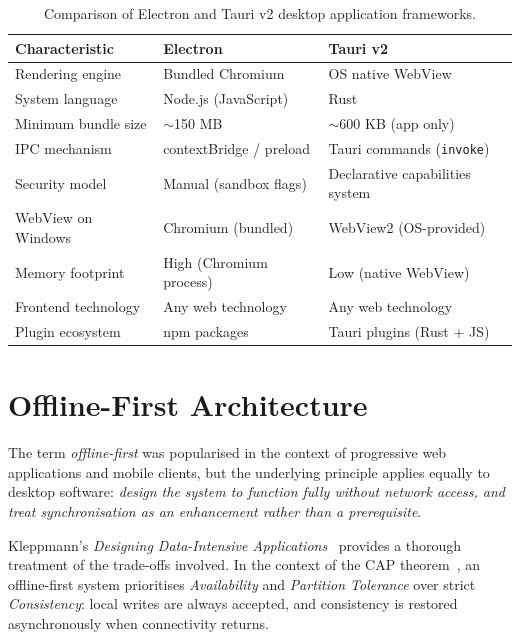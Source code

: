 \begin{table}[H]
\centering
\caption{Comparison of Electron and Tauri v2 desktop application frameworks.}
\label{tab:electron_tauri_comparison}
\begin{tabular}{lll}
\toprule
\textbf{Characteristic} &
\textbf{Electron} &
\textbf{Tauri v2} \\
\midrule
Rendering engine &
Bundled Chromium &
OS native WebView \\
System language &
Node.js (JavaScript) &
Rust \\
Minimum bundle size &
$\sim$150 MB &
$\sim$600 KB (app only) \\
IPC mechanism &
contextBridge / preload &
Tauri commands (\texttt{invoke}) \\
Security model &
Manual (sandbox flags) &
Declarative capabilities system \\
WebView on Windows &
Chromium (bundled) &
WebView2 (OS-provided) \\
Memory footprint &
High (Chromium process) &
Low (native WebView) \\
Frontend technology &
Any web technology &
Any web technology \\
Plugin ecosystem &
npm packages &
Tauri plugins (Rust + JS) \\
\bottomrule
\end{tabular}
\end{table}

\section{Offline-First Architecture}\label{sec:bg_offline}

The term \emph{offline-first} was popularised in the context of progressive web
applications and mobile clients, but the underlying principle applies equally to
desktop software: \emph{design the system to function fully without network access,
and treat synchronisation as an enhancement rather than a prerequisite}.

Kleppmann's \emph{Designing Data-Intensive Applications}~\cite{kleppmann2017designing}
provides a thorough treatment of the trade-offs involved.
In the context of the CAP theorem~\cite{brewer2012cap}, an offline-first system
prioritises \emph{Availability} and \emph{Partition Tolerance} over strict
\emph{Consistency}: local writes are always accepted, and consistency is restored
asynchronously when connectivity returns.

